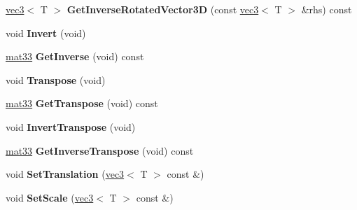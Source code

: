 \begin{DoxyCompactItemize}
\item 
\hypertarget{classmath_1_1mat33_a361ca97e1655e1d5902ebe87803c2dbd}{
\hyperlink{classmath_1_1vec3}{vec3}$<$ T $>$ {\bfseries GetInverseRotatedVector3D} (const \hyperlink{classmath_1_1vec3}{vec3}$<$ T $>$ \&rhs) const }
\label{classmath_1_1mat33_a361ca97e1655e1d5902ebe87803c2dbd}

\item 
\hypertarget{classmath_1_1mat33_adb76a471993284b321afcf34018597cb}{
void {\bfseries Invert} (void)}
\label{classmath_1_1mat33_adb76a471993284b321afcf34018597cb}

\item 
\hypertarget{classmath_1_1mat33_a4abc5e21e03bfaab8308e8601a6c42ae}{
\hyperlink{classmath_1_1mat33}{mat33} {\bfseries GetInverse} (void) const }
\label{classmath_1_1mat33_a4abc5e21e03bfaab8308e8601a6c42ae}

\item 
\hypertarget{classmath_1_1mat33_a0fd3a7e4f4d6458cc67570a7f007b3d9}{
void {\bfseries Transpose} (void)}
\label{classmath_1_1mat33_a0fd3a7e4f4d6458cc67570a7f007b3d9}

\item 
\hypertarget{classmath_1_1mat33_a691659ea97f3ae5ad9dc372f4d4f08d6}{
\hyperlink{classmath_1_1mat33}{mat33} {\bfseries GetTranspose} (void) const }
\label{classmath_1_1mat33_a691659ea97f3ae5ad9dc372f4d4f08d6}

\item 
\hypertarget{classmath_1_1mat33_a818490de753ccec391254bf46500b62d}{
void {\bfseries InvertTranspose} (void)}
\label{classmath_1_1mat33_a818490de753ccec391254bf46500b62d}

\item 
\hypertarget{classmath_1_1mat33_ad21471ced0f17f1c4c3b3f345b1c5855}{
\hyperlink{classmath_1_1mat33}{mat33} {\bfseries GetInverseTranspose} (void) const }
\label{classmath_1_1mat33_ad21471ced0f17f1c4c3b3f345b1c5855}

\item 
\hypertarget{classmath_1_1mat33_aebaa2d870af1562c130f27c3b3f7d548}{
void {\bfseries SetTranslation} (\hyperlink{classmath_1_1vec3}{vec3}$<$ T $>$ const \&)}
\label{classmath_1_1mat33_aebaa2d870af1562c130f27c3b3f7d548}

\item 
\hypertarget{classmath_1_1mat33_ae2e3fd233ad0d1bca6c993a96a22be85}{
void {\bfseries SetScale} (\hyperlink{classmath_1_1vec3}{vec3}$<$ T $>$ const \&)}
\label{classmath_1_1mat33_ae2e3fd233ad0d1bca6c993a96a22be85}


\end{DoxyCompactItemize}
